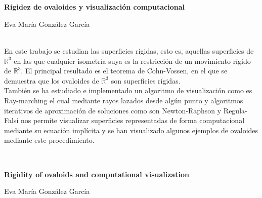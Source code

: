 \chapter*{}






\cleardoublepage
\thispagestyle{empty}

\begin{center}
{\large\bfseries Rigidez de ovaloides y visualización computacional}\\
\end{center}
\begin{center}
Eva María González García\\
\end{center}


\vspace{0.7cm}
\\

En este trabajo se estudian las superficies rígidas, esto es, aquellas superficies de $\mathbb{R}^3$ en las que cualquier isometría suya es la restricción de un movimiento rígido de $\mathbb{R}^3$. El principal resultado es el teorema de Cohn-Vossen, en el que se demuestra que los ovaloides de $\mathbb{R}^3$ son superficies rígidas.
${ }$\\

También se ha estudiado e implementado un algoritmo de visualización como es Ray-marching el cual mediante rayos lazados desde algún punto y algoritmos iterativos de aproximación de soluciones como son Newton-Raphson y Regula-Falsi nos permite visualizar superficies representadas de forma computacional mediante su ecuación implícita y se han visualizado algunos ejemplos de ovaloides mediante este procedimiento.


\vspace{0.7cm}
\\
\cleardoublepage


\thispagestyle{empty}


\begin{center}
{\large\bfseries Rigidity of ovaloids and computational visualization}\\
\end{center}
\begin{center}
Eva María González García\\
\end{center}

